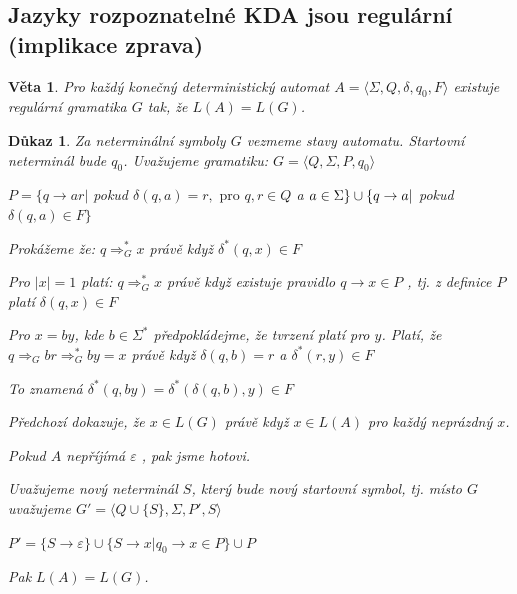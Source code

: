 \documentclass[10pt, a4paper, titlepage]{article}
\theoremstyle{note}
\newtheorem{veta}{\textbf{Věta}}
\newtheorem{dukaz}{\textbf{Důkaz}}
\begin{document}
\subsection{Jazyky rozpoznatelné KDA jsou regulární (implikace zprava)}

\begin{veta} 
Pro každý konečný deterministický automat $A = \langle \Sigma,Q,\delta,q_0,F \rangle$ existuje regulární gramatika $G$ tak, že $L(A)=L(G)$.
\end{veta}

\begin{dukaz}
Za neterminální symboly $G$ vezmeme stavy automatu. Startovní neterminál bude $q_0$. Uvažujeme gramatiku:
$G = \langle Q,\Sigma,P,q_0 \rangle$

$P = \lbrace q \rightarrow ar |$ pokud $\delta (q,a)=r, \text{ pro } q,r \in Q$ a $a \in \Sigma \rbrace \\ \cup \lbrace q \rightarrow a |$ pokud $\delta (q,a) \in F \rbrace$ 

Prokážeme že: $ q \Rightarrow_G^* x $ právě když $ \delta^* (q,x) \in F$

Pro $|x|=1$ platí: $ q \Rightarrow_G^* x $ právě když existuje pravidlo $q \rightarrow x \in P$ , tj. z definice $P$ platí $\delta (q,x) \in F$

Pro $x=by$, kde $b \in \Sigma^*$ předpokládejme, že tvrzení platí pro $y$. Platí, že $q \Rightarrow_G br \Rightarrow_G^* by = x$ právě když $\delta (q,b)=r$ a $\delta^* (r,y) \in F$

To znamená $\delta^* (q,by) = \delta^* ( \delta (q,b),y) \in F$

Předchozí dokazuje, že $x \in L(G)$ právě když $x \in L(A)$ pro každý neprázdný $x$.

Pokud $A$ nepříjímá $\varepsilon$ , pak jsme hotovi.

Uvažujeme nový neterminál $S$, který bude nový startovní symbol, tj. místo $G$ uvažujeme $G'= \langle Q \cup \lbrace S \rbrace,\Sigma,P',S \rangle$

$P'= \lbrace S \rightarrow \varepsilon \rbrace \cup \lbrace S \rightarrow x | q_0 \rightarrow x \in P \rbrace \cup P$

Pak $L(A)=L(G)$.
\end{dukaz}
\end{document}
